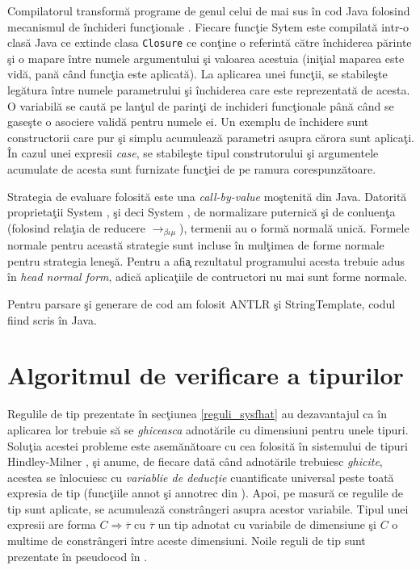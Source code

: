 Compilatorul transform\u a programe de genul celui de mai sus \^ in cod Java folosind mecanismul de \^ inchideri func\c tionale \citep{DBLP:books/wi/GruneBJL2002}. Fiecare func\c tie Sytem \fhat este compilat\u a intr-o clas\u a Java ce extinde clasa \texttt{Closure} ce con\c tine o referint\u a c\u atre \^ inchiderea p\u arinte \c si o mapare \^ intre numele argumentului \c si valoarea acestuia (ini\c tial maparea este vid\u a, pan\u a c\^ and func\c tia este aplicat\u a). La aplicarea unei func\c tii, se stabile\c ste leg\u atura \^ intre numele parametrului \c si \^ inchiderea care este reprezentat\u a de acesta. O variabil\u a se caut\u a pe lan\c tul de parin\c ti de inchideri func\c tionale p\^ an\u a c\^ and se gase\c ste o asociere valid\u a pentru numele ei. Un exemplu de \^ inchidere sunt constructorii care pur \c si simplu acumuleaz\u a parametri asupra c\u arora sunt aplica\c ti. \^ In cazul unei expresii \emph{case}, se stabile\c ste tipul construtorului \c si argumentele acumulate de acesta sunt furnizate func\c tiei de pe ramura corespunz\u atoare.

Strategia de evaluare folosit\u a este una \emph{call-by-value} mo\c stenit\u a din Java. Datorit\u a proprieta\c tii System \frec, \c si deci System \fhat, de normalizare puternic\u a \c si de conluen\c ta (folosind rela\c tia de reducere $\to_{\beta\iota\mu}$), termenii au o form\u a normal\u a unic\u a. Formele normale pentru aceast\u a strategie sunt incluse \^ in mul\c timea de forme normale pentru strategia lene\c s\u a. Pentru a afi\c a rezultatul programului acesta trebuie adus \^ in \emph{head normal form}, adic\u a aplica\c tiile de contructori nu mai sunt forme normale. 

Pentru parsare \c si generare de cod am folosit ANTLR \c si StringTemplate, codul fiind scris \^ in Java.

\section{Algoritmul de verificare a tipurilor}

Regulile de tip prezentate \^ in sec\c tiunea \ref{reguli_sysfhat} au dezavantajul ca \^ in aplicarea lor trebuie s\u a se \emph{ghiceasca} adnot\u arile cu dimensiuni pentru unele tipuri. Solu\c tia acestei probleme \citep{DBLP:conf/tlca/BartheGP05} este a\-se\-m\u a\-n\u a\-to\-a\-re cu cea folosit\u a \^ in sistemului de tipuri Hindley-Milner \citep{ATTAPL}, \c si anume, de fiecare dat\u a c\^ and adnot\u arile trebuiesc \emph{ghicite}, acestea se \^ inlocuiesc cu \emph{variablie de deduc\c tie} cuantificate universal peste toat\u a expresia de tip (func\c tiile annot \c si annotrec din ). Apoi, pe masur\u a ce regulile de tip sunt aplicate, se acumuleaz\u a constr\^ angeri asupra acestor variabile. Tipul unei expresii are forma $C \Rightarrow \overline{\tau}$ cu $\overline{\tau}$ un tip adnotat cu variabile de dimensiune \c si $C$ o multime de constr\^ angeri \^ intre aceste dimensiuni. Noile reguli de tip sunt prezentate \^ in pseudocod \^ in .


